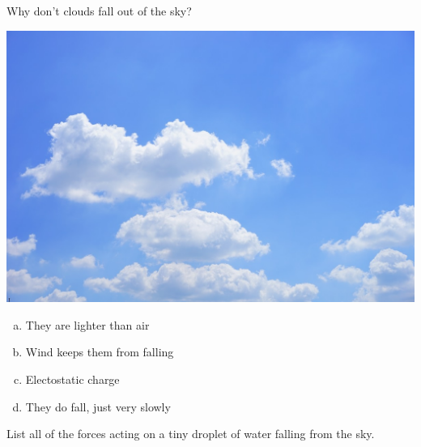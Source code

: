 
\begin{applicationActivities}




\begin{activity}{5}
Why don't clouds fall out of the sky?
\begin{center}
\includegraphics[scale=0.2]{media/cloud.jpg}
\end{center}

\begin{enumerate}[(a)]
\item They are lighter than air
\item Wind keeps them from falling
\item Electostatic charge
\item They do fall, just very slowly
\end{enumerate}
\end{activity}

\begin{activity}{5}
List all of the forces acting on a tiny droplet of water falling from the sky.
\end{activity}


\end{applicationActivities}
